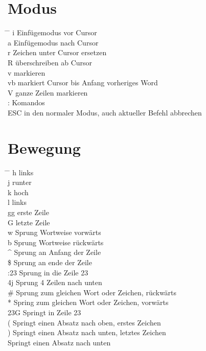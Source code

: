 \documentclass[a4paper,11pt,twoside]{article}
\begin{document}
\section*{Modus}
\begin{tabbing}
  \hspace{3mm} \= \hspace{20mm} \= \kill
  \> i \> Einfügemodus vor Cursor \\
  \> a \> Einfügemodus nach Cursor \\
  \> r \> Zeichen unter Cursor ersetzen \\ 
  \> R \> überschreiben ab Cursor \\
  \> v \> markieren \\
  \> vb \> markiert Cursor bis Anfang vorheriges Word \\
  \> V \> ganze Zeilen markieren \\
  \> : \> Komandos \\
  \> ESC \> in den normaler Modus, auch aktueller Befehl abbrechen \\
\end{tabbing}

\section*{Bewegung}
\begin{tabbing}
  \hspace{3mm} \= \hspace{20mm} \= \kill
  \> h \> links \\ 
  \> j \> runter \\ 
  \> k \> hoch \\ 
  \> l \> links \\ 
  \> gg \> erste Zeile \\ 
  \> G \> letzte Zeile \\
  \> w \> Sprung Wortweise vorwärts \\ 
  \> b \> Sprung Wortweise rückwärts \\
  \> \^{} \> Sprung an Anfang der Zeile \\
  \> \$ \> Sprung an ende der Zeile \\
  \> :23 \> Sprung in die Zeile 23 \\ 
  \> 4j \> Sprung 4 Zeilen nach unten \\
  \> \# \> Sprung zum gleichen Wort oder Zeichen, rückwärts \\ 
  \> * \> Spring zum gleichen Wort oder Zeichen, vorwärts \\
  \> 23G \> Springt in Zeile 23 \\
  \> ( \> Springt einen Absatz nach oben, erstes Zeichen \\ 
  \> ) \> Springt einen Absatz nach unten, letztes Zeichen \\
   \> Springt einen Absatz nach unten \\
\end{tabbing}
\end{document}
